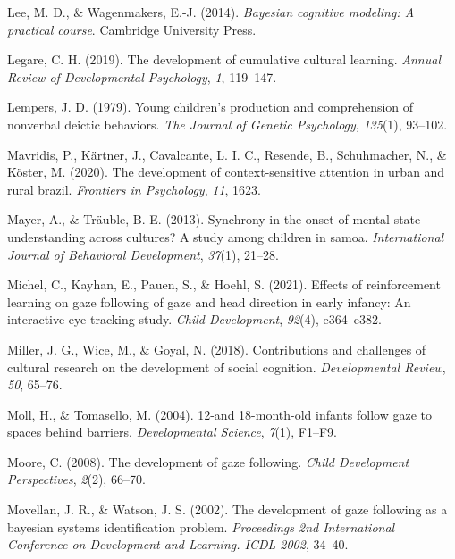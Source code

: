 \documentclass[
  man,floatsintext]{apa7}
\newlength{\cslhangindent}
\newenvironment{CSLReferences}[2] %
 {\begin{list}{}{%
  \setlength{\itemindent}{0pt}
  \setlength{\leftmargin}{0pt}
  \setlength{\parsep}{0pt}
  \ifodd #1
   \setlength{\leftmargin}{\cslhangindent}
   \setlength{\itemindent}{-1\cslhangindent}
  \fi
  \setlength{\itemsep}{#2\baselineskip}}}
 {\end{list}}
\begin{document}
\begin{CSLReferences}{1}{0}
Lee, M. D., \& Wagenmakers, E.-J. (2014). \emph{Bayesian cognitive modeling: A practical course}. Cambridge University Press.

Legare, C. H. (2019). The development of cumulative cultural learning. \emph{Annual Review of Developmental Psychology}, \emph{1}, 119--147.

Lempers, J. D. (1979). Young children's production and comprehension of nonverbal deictic behaviors. \emph{The Journal of Genetic Psychology}, \emph{135}(1), 93--102.

Mavridis, P., Kärtner, J., Cavalcante, L. I. C., Resende, B., Schuhmacher, N., \& Köster, M. (2020). The development of context-sensitive attention in urban and rural brazil. \emph{Frontiers in Psychology}, \emph{11}, 1623.

Mayer, A., \& Träuble, B. E. (2013). Synchrony in the onset of mental state understanding across cultures? A study among children in samoa. \emph{International Journal of Behavioral Development}, \emph{37}(1), 21--28.

Michel, C., Kayhan, E., Pauen, S., \& Hoehl, S. (2021). Effects of reinforcement learning on gaze following of gaze and head direction in early infancy: An interactive eye-tracking study. \emph{Child Development}, \emph{92}(4), e364--e382.

Miller, J. G., Wice, M., \& Goyal, N. (2018). Contributions and challenges of cultural research on the development of social cognition. \emph{Developmental Review}, \emph{50}, 65--76.

Moll, H., \& Tomasello, M. (2004). 12-and 18-month-old infants follow gaze to spaces behind barriers. \emph{Developmental Science}, \emph{7}(1), F1--F9.

Moore, C. (2008). The development of gaze following. \emph{Child Development Perspectives}, \emph{2}(2), 66--70.

Movellan, J. R., \& Watson, J. S. (2002). The development of gaze following as a bayesian systems identification problem. \emph{Proceedings 2nd International Conference on Development and Learning. ICDL 2002}, 34--40.


\end{CSLReferences}
\end{document}
